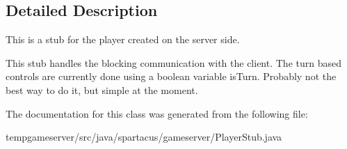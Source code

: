 \subsection{Detailed Description}
This is a stub for the player created on the server side. 

This stub handles the blocking communication with the client. The turn based controls are currently done using a boolean variable isTurn. Probably not the best way to do it, but simple at the moment. 

The documentation for this class was generated from the following file:\begin{DoxyCompactItemize}
\item 
\-t\-e\-m\-p\-g\-a\-m\-e\-s\-e\-r\-v\-e\-r\-/\-s\-r\-c\-/\-j\-a\-v\-a\-/\-s\-p\-a\-r\-t\-a\-c\-u\-s\-/\-g\-a\-m\-e\-s\-e\-r\-v\-e\-r\-/\-P\-l\-a\-y\-e\-r\-S\-t\-u\-b\-.\-j\-a\-v\-a\end{DoxyCompactItemize}
